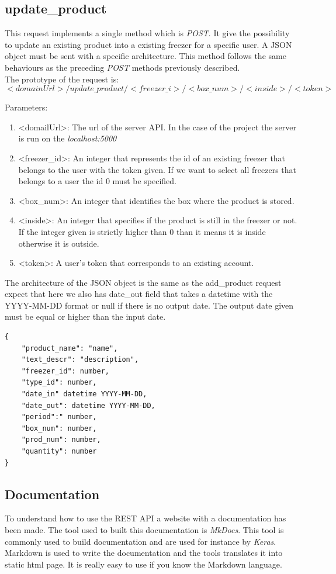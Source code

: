 \subsection{update\_product}
This request implements a single method which is \textit{POST}. It give the possibility to update an existing product into a existing freezer for a specific user. A JSON object must be sent with a specific architecture. This method follows the same behaviours as the preceding \textit{POST} methods previously described.\\

The prototype of the request is:
$$<domainUrl>/update\_product/<freezer\_i>/<box\_num>/<inside>/<token>$$

Parameters:
\begin{enumerate}
\item <domailUrl>: The url of the server API. In the case of the project the server is run on the \textit{localhost:5000}
\item <freezer\_id>: An integer that represents the id of an existing freezer that belongs to the user with the token given. If we want to select all freezers that belongs to a user the id 0 must be specified.
\item <box\_num>: An integer that identifies the box where the product is stored.
\item <inside>: An integer that specifies if the product is still in the freezer or not. If the integer given is strictly higher than 0 than it means it is inside otherwise it is outside.
\item <token>: A user's token that corresponds to an existing account.
\end{enumerate}

The architecture of the JSON object is the same as the add\_product request expect that here we also has date\_out field that takes a datetime with the YYYY-MM-DD format or null if there is no output date. The output date given must be equal or higher than the input date.
\begin{lstlisting}
{
    "product_name": "name",
    "text_descr": "description",
    "freezer_id": number,
    "type_id": number,
    "date_in" datetime YYYY-MM-DD,
    "date_out": datetime YYYY-MM-DD,
    "period":" number,
    "box_num": number,
    "prod_num": number,
    "quantity": number
}
\end{lstlisting}

\subsection{Documentation}
To understand how to use the REST API a website with a documentation has been made. The tool used to built this documentation is \textit{MkDocs}. This tool is commonly used to build documentation and are used for instance by \textit{Keras}. Markdown is used to write the documentation and the tools translates it into static html page. It is really easy to use if you know the Markdown language. \\

